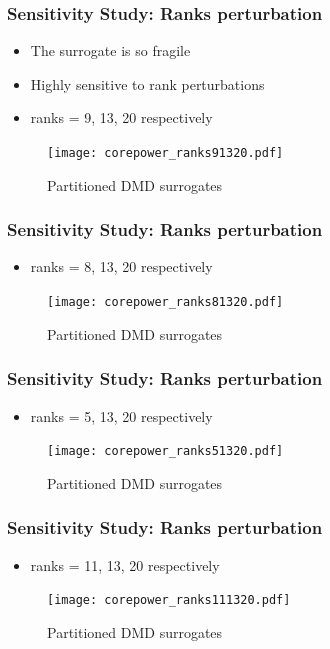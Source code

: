 \documentclass[fleqn]{beamer}
\begin{document}
\begin{frame}
\frametitle{Sensitivity Study: Ranks perturbation}
\begin{itemize}
 \item The surrogate is so fragile
 \item Highly sensitive to rank perturbations
 \item ranks = 9, 13, 20 respectively
\end{itemize}

\begin{figure}[ht]

\texttt{[image: corepower\_ranks91320.pdf]}
\caption{Partitioned DMD surrogates}
\end{figure}
\end{frame}

\begin{frame}
\frametitle{Sensitivity Study: Ranks perturbation}
\begin{itemize}
 \item ranks = 8, 13, 20 respectively
\end{itemize}
\begin{figure}[ht]
\texttt{[image: corepower\_ranks81320.pdf]}
\caption{Partitioned DMD surrogates}
\end{figure}
\end{frame}

\begin{frame}
\frametitle{Sensitivity Study: Ranks perturbation}
\begin{itemize}
 \item ranks = 5, 13, 20 respectively
\end{itemize}

\begin{figure}[ht]

\texttt{[image: corepower\_ranks51320.pdf]}
\caption{Partitioned DMD surrogates}
\end{figure}
\end{frame}

\begin{frame}
\frametitle{Sensitivity Study: Ranks perturbation}
\begin{itemize}
 \item ranks = 11, 13, 20 respectively
\end{itemize}
\begin{figure}[ht]
\texttt{[image: corepower\_ranks111320.pdf]}
\caption{Partitioned DMD surrogates}
\end{figure}
\end{frame}
\end{document}
